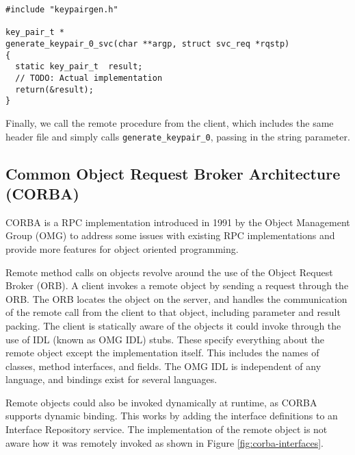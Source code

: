 \begin{lstlisting}
#include "keypairgen.h"

key_pair_t *
generate_keypair_0_svc(char **argp, struct svc_req *rqstp)
{
  static key_pair_t  result;
  // TODO: Actual implementation
  return(&result);
}
\end{lstlisting}

Finally, we call the remote procedure from the client, which includes the same header file and simply calls \lstinline+generate_keypair_0+, passing in the string parameter.



\subsection{Common Object Request Broker Architecture (CORBA)} %
\label{sub:corba_intro}

CORBA is a RPC implementation introduced in 1991 by the Object Management Group (OMG) to address some issues with existing RPC implementations and provide more features for object oriented programming.

Remote method calls on objects revolve around the use of the Object Request Broker (ORB)\cite{isocorba}. A client invokes a remote object by sending a request through the ORB. The ORB locates the object on the server, and handles the communication of the remote call from the client to that object, including parameter and result packing. The client is statically aware of the objects it could invoke through the use of IDL (known as OMG IDL) stubs. These specify everything about the remote object except the implementation itself. This includes the names of classes, method interfaces, and fields. The OMG IDL is independent of any language, and bindings exist for several languages. 

Remote objects could also be invoked dynamically at runtime, as CORBA supports dynamic binding. This works by adding the interface definitions to an Interface Repository service. The implementation of the remote object is not aware how it was remotely invoked as shown in Figure \ref{fig:corba-interfaces}.

